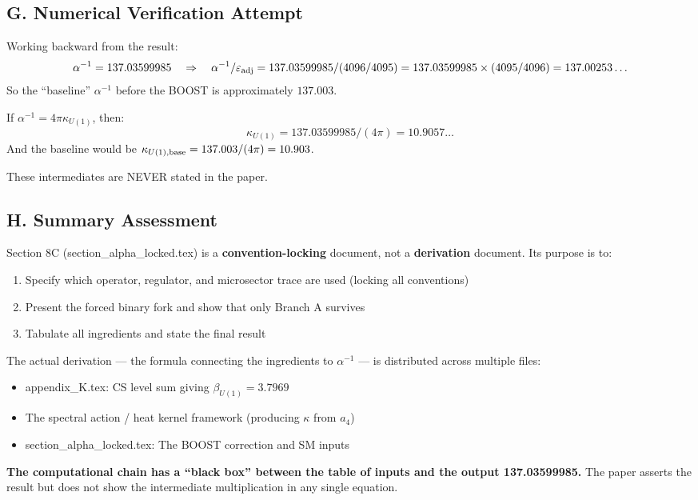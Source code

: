 \subsection*{G. Numerical Verification Attempt}

Working backward from the result:
\[
  \alpha^{-1} = 137.03599985
  \quad\Rightarrow\quad
  \alpha^{-1}/\varepsilon_{\rm adj} = 137.03599985 / (4096/4095)
  = 137.03599985 \times (4095/4096) = 137.00253\ldots
\]
So the ``baseline'' $\alpha^{-1}$ before the BOOST is approximately $137.003$.

If $\alpha^{-1} = 4\pi\kappa_{U(1)}$, then:
\[
  \kappa_{U(1)} = 137.03599985 / (4\pi) = 10.9057\ldots
\]
And the baseline would be $\kappa_{U(1),\rm base} = 137.003/(4\pi) = 10.903$.

These intermediates are NEVER stated in the paper.

\subsection*{H. Summary Assessment}

Section 8C (section\_alpha\_locked.tex) is a \textbf{convention-locking} document,
not a \textbf{derivation} document. Its purpose is to:
\begin{enumerate}
  \item Specify which operator, regulator, and microsector trace are used (locking
        all conventions)
  \item Present the forced binary fork and show that only Branch A survives
  \item Tabulate all ingredients and state the final result
\end{enumerate}

The actual derivation --- the formula connecting the ingredients to $\alpha^{-1}$
--- is distributed across multiple files:
\begin{itemize}
  \item appendix\_K.tex: CS level sum giving $\beta_{U(1)} = 3.7969$
  \item The spectral action / heat kernel framework (producing $\kappa$ from $a_4$)
  \item section\_alpha\_locked.tex: The BOOST correction and SM inputs
\end{itemize}

\textbf{The computational chain has a ``black box'' between the table of inputs
and the output 137.03599985.} The paper asserts the result but does not show the
intermediate multiplication in any single equation.



